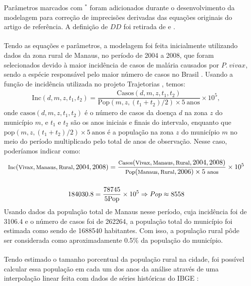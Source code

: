 \vspace{1cm}
Parâmetros marcados com $^*$ foram adicionados durante o desenvolvimento da modelagem para correção de imprecisões derivadas das equações originais do artigo de referência. 
A definição de $DD$ foi retirada de \cite{McCord2016} e \cite{10665-41724}.
\\\\
Tendo as equações e parâmetros, a modelagem foi feita inicialmente 
utilizando dados da zona rural de Manaus, no período de 2004 a 2008, 
que foram selecionados devido à maior incidência de casos de malária causados 
por $P. \ vivax$, sendo a espécie responsável pelo maior número de
casos no Brasil \cite{OliveiraFerreira2010, 10.3389/fpubh.2021.647754}. Usando a função de incidência utilizada no projeto 
Trajetorias \cite{Rorato2023}, temos:
\begin{gather*}
    \text{Inc}(d, m, z, t_1, t_2) = \dfrac{\text{Casos}(d, m, z, t_1, t_2)}{\text{Pop}(m,z,(t_1+t_2)/2) \times 5 \ \text{anos}} \times 10^5,
\end{gather*}
onde $\text{casos}(d, m, z, t_1, t_2)$ é o número de casos da doença $d$ na zona $z$ do município $m$, e $t_1$ e $t_2$ são os anos iniciais e finais do intervalo, enquanto que $\text{pop}(m,z,(t_1+t_2)/2) \times 5 \ \text{anos}$ é a população na zona $z$ do município $m$ no meio do período multiplicado pelo total de anos de observação. Nesse caso, poderíamos indicar como:
\begin{gather*}
    \footnotesize{\text{Inc}(\text{Vivax}, \text{Manaus}, \text{Rural}, 2004, 2008) = \dfrac{\text{Casos}(\text{Vivax}, \text{Manaus}, \text{Rural}, 2004, 2008)}{\text{Pop}(\text{Manaus}, \text{Rural}, 2006) \times 5 \ \text{anos}} \times 10^5}  \\\\
    184030.8 = \dfrac{78745}{5\text{Pop}} \times 10^5 \Rightarrow Pop \approx 8558
\end{gather*}
Usando dados da população total de Manaus nesse período, cuja incidência foi de 3106.4 e o número de casos foi de 262264, a população total do município foi estimada como sendo de 1688540 habitantes. Com isso, a população rural pôde ser considerada como aproximadamente 0.5$\%$ da população do município.
\\\\
Tendo estimado o tamanho porcentual da população rural na cidade, 
foi possível calcular essa população em cada um dos anos da análise 
através de uma interpolação linear feita com dados de séries históricas 
do IBGE \cite{popIBGE}:

